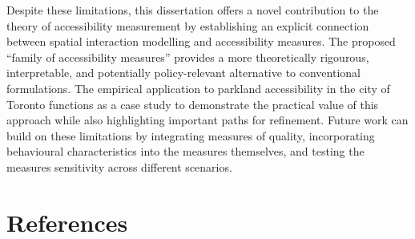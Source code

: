 \documentclass[
11pt, %
oneside, %
english, %
singlespacing, %
]{macthesis} %
\begin{document}
Despite these limitations, this dissertation offers a novel contribution to the theory of accessibility measurement by establishing an explicit connection between spatial interaction modelling and accessibility measures. The proposed ``family of accessibility measures'' provides a more theoretically rigourous, interpretable, and potentially policy-relevant alternative to conventional formulations. The empirical application to parkland accessibility in the city of Toronto functions as a case study to demonstrate the practical value of this approach while also highlighting important paths for refinement. Future work can build on these limitations by integrating measures of quality, incorporating behavioural characteristics into the measures themselves, and testing the measures sensitivity across different scenarios.

\backmatter

\chapter*{References}\label{references}


\noindent

\setlength{\parindent}{-0.20in}
\setlength{\leftskip}{0.20in}
\setlength{\parskip}{8pt}
\end{document}
